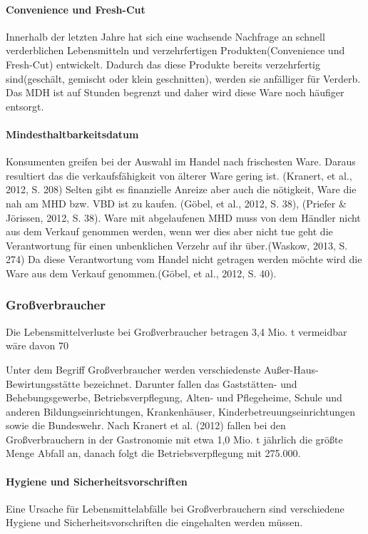 \paragraph{Convenience und Fresh-Cut}
Innerhalb der letzten Jahre hat sich eine wachsende Nachfrage an schnell verderblichen Lebensmitteln und verzehrfertigen Produkten(Convenience und Fresh-Cut) entwickelt. Dadurch das diese Produkte bereits verzehrfertig sind(geschält, gemischt oder klein geschnitten), werden sie anfälliger für Verderb.%
Das MDH ist auf Stunden begrenzt und daher wird diese Ware noch häufiger entsorgt. %

\paragraph{Mindesthaltbarkeitsdatum}
Konsumenten greifen bei der Auswahl im Handel nach frischesten Ware. Daraus resultiert das die verkaufsfähigkeit von älterer Ware gering ist. (Kranert, et al., 2012, S. 208) 
Selten gibt es finanzielle Anreize aber auch die nötigkeit, Ware die nah am MHD bzw. VBD ist zu kaufen.   (Göbel, et al., 2012, S. 38), (Priefer & Jörissen, 2012, S. 38). Ware mit abgelaufenen MHD muss von dem Händler nicht aus dem Verkauf genommen werden, wenn wer dies aber nicht tue geht die Verantwortung für einen unbenklichen Verzehr auf ihr über.(Waskow, 2013, S. 274) Da diese Verantwortung vom Handel nicht getragen werden möchte wird die Ware aus dem Verkauf genommen.(Göbel, et al., 2012, S. 40).


\subsubsection{Großverbraucher}
Die Lebensmittelverluste bei Großverbraucher betragen 3,4 Mio. t vermeidbar wäre davon 70 %

Unter dem Begriff Großverbraucher werden verschiedenste Außer-Haus-Bewirtungsstätte bezeichnet. Darunter fallen das Gaststätten- und Behebungsgewerbe, Betriebsverpflegung, Alten- und Pflegeheime, Schule und anderen Bildungseinrichtungen, Krankenhäuser, Kinderbetreuungseinrichtungen sowie die Bundeswehr. Nach Kranert et al. (2012) fallen bei den Großverbrauchern in der Gastronomie mit etwa 1,0 Mio. t jährlich die größte Menge Abfall an, danach folgt die Betriebsverpflegung mit 275.000. %

\paragraph{Hygiene und Sicherheitsvorschriften}
Eine Ursache für Lebensmittelabfälle bei Großverbrauchern sind verschiedene Hygiene und Sicherheitsvorschriften die eingehalten werden müssen.

